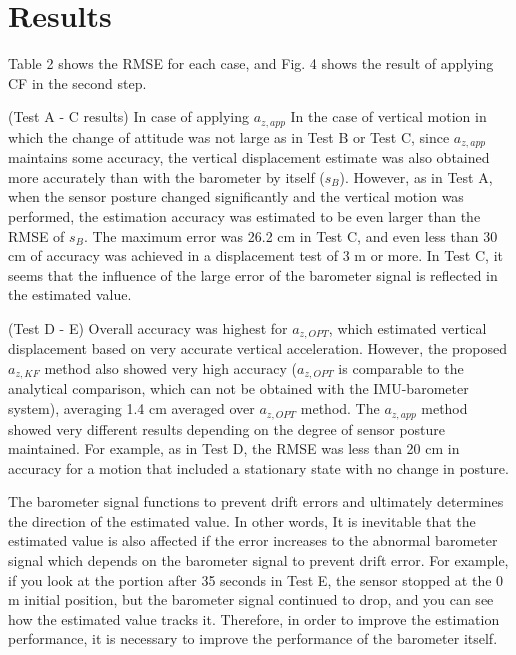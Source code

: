 \documentclass[10pt,journal,compsoc]{IEEEtran}
\begin{document}
\section{Results}

Table 2 shows the RMSE for each case, and Fig. 4 shows the result of applying CF in the second step.

(Test A - C results) In case of applying $a_{z,app}$ In the case of vertical
motion in which the change of attitude was not large as in Test B or Test C,
since $a_{z,app}$ maintains some accuracy, the vertical displacement estimate
was also obtained more accurately than with the barometer by itself ($s_B$).
However, as in Test A, when the sensor posture changed significantly and the
vertical motion was performed, the estimation accuracy was estimated to be even
larger than the RMSE of $s_B$. The maximum error was 26.2 cm in Test C, and
even less than 30 cm of accuracy was achieved in a displacement test of 3 m or
more. In Test C, it seems that the influence of the large error of the
barometer signal is reflected in the estimated value.

(Test D - E) Overall accuracy was highest for $a_{z,OPT}$, which estimated
vertical displacement based on very accurate vertical acceleration. However,
the proposed $a_{z,KF}$ method also showed very high accuracy ($a_{z,OPT}$ is
comparable to the analytical comparison, which can not be obtained with the
IMU-barometer system), averaging 1.4 cm averaged over $a_{z,OPT}$ method.
The $a_{z,app}$ method showed very different results depending on the degree of
sensor posture maintained.  For example, as in Test D, the RMSE was less than 20
cm in accuracy for a motion that included a stationary state with no change in
posture.

The barometer signal functions to prevent drift errors and ultimately
determines the direction of the estimated value. In other words, It is
inevitable that the estimated value is also affected if the error increases to
the abnormal barometer signal which depends on the barometer signal to prevent
drift error.  For example, if you look at the portion after 35 seconds in Test
E, the sensor stopped at the 0 m initial position, but the barometer signal
continued to drop, and you can see how the estimated value tracks it. Therefore, in
order to improve the estimation performance, it is necessary to improve the
performance of the barometer itself.


\end{document}
